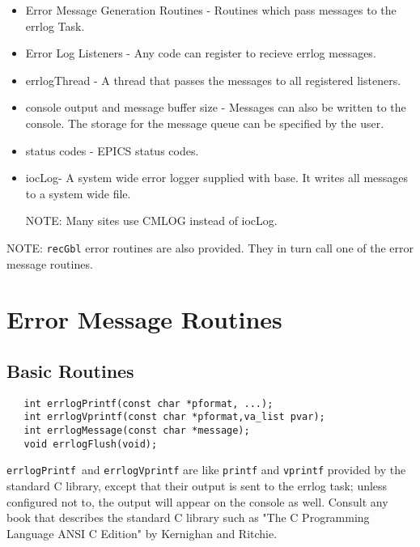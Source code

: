\begin{itemize}\item Error Message Generation Routines - Routines which pass messages to the errlog Task.

\item Error Log Listeners - Any code can register to recieve errlog messages.

\item errlogThread - A thread that passes the messages to all registered listeners.

\item console output and message buffer size - Messages can also be written to the console. The storage for the message 
queue can be specified by the user.

\item status codes - EPICS status codes.

\item iocLog- A system wide error logger supplied with base. It writes all messages to a system wide file.

NOTE: Many sites use CMLOG instead of iocLog.

\end{itemize}NOTE: \verb|recGbl| error routines are also provided. They in turn call one of the error message routines.

\section{Error Message Routines}

\subsection{Basic Routines}

\begin{verbatim}   int errlogPrintf(const char *pformat, ...);
   int errlogVprintf(const char *pformat,va_list pvar);
   int errlogMessage(const char *message);
   void errlogFlush(void);
\end{verbatim}
 \verb|errlogPrintf |and  \verb|errlogVprintf| are like \verb|printf| and \verb|vprintf| provided by the standard C library, except 
that their output is sent to the errlog task; unless configured not to, the output will appear on the console as well. Consult 
any book that describes the standard C library such as "The C Programming Language ANSI C Edition" by Kernighan 
and Ritchie.

